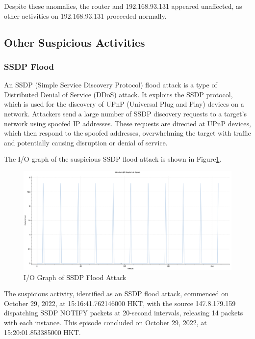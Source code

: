 \documentclass{article}
\begin{document}
    Despite these anomalies, the router and 192.168.93.131 appeared unaffected, as other activities on 192.168.93.131 proceeded normally.

    \subsection{\fontsize{14pt}{17pt}\selectfont Other Suspicious Activities}\label{subsec:other-suspicious-activities}

    \subsubsection{SSDP Flood}\label{subsubsec:ssdp-flood}
    An SSDP (Simple Service Discovery Protocol) flood attack is a type of Distributed Denial of Service (DDoS) attack. 
    It exploits the SSDP protocol, which is used for the discovery of UPnP (Universal Plug and Play) devices on a network. 
    Attackers send a large number of SSDP discovery requests to a target's network using spoofed IP addresses. 
    These requests are directed at UPnP devices, which then respond to the spoofed addresses, overwhelming the target with traffic and potentially causing disruption or denial of service.

    The I/O graph of the suspicious SSDP flood attack is shown in Figure\ref{fig:ssdp-flood-io-graph}.

    \begin{figure}[H]
        \centering
        \includegraphics[width=\textwidth]{image/159_ssdp.png}
        \caption{I/O Graph of SSDP Flood Attack}
        \label{fig:ssdp-flood-io-graph}
    \end{figure}

    The suspicious activity, identified as an SSDP flood attack, commenced on October 29, 2022, at 15:16:41.762146000 HKT, 
    with the source 147.8.179.159 dispatching SSDP NOTIFY packets at 20-second intervals, 
    releasing 14 packets with each instance. 
    This episode concluded on October 29, 2022, at 15:20:01.853385000 HKT.
\end{document}
